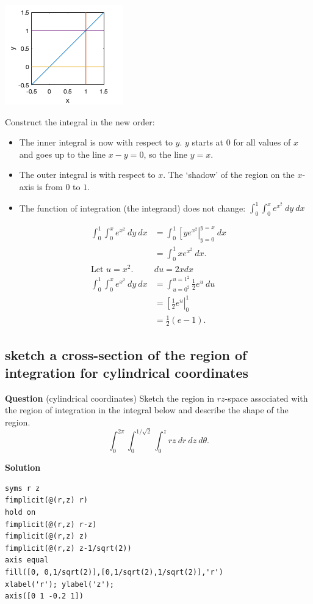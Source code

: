 \documentclass[12pt,letterpaper,noanswers]{exam}
\begin{document}
\includegraphics{img/C12-2dregion.png}

Construct the integral in the new order:
\begin{itemize}
\itemsep0em
    \item The inner integral is now with respect to $y$.  $y$ starts at $0$ for all values of $x$ and goes up to the line $x - y = 0$, so the line $y = x$.  
    \item The outer integral is with respect to $x$.  The `shadow' of the region on the $x$-axis is from $0$ to $1$.
    \item The function of integration (the integrand) does not change: $\displaystyle\int_0^1\int_0^x e^{x^2}\ dy\ dx$
\end{itemize}
\begin{align*}
    \int_0^1\int_0^x e^{x^2}\ dy\ dx &= \int_0^1\left[y e^{x^2}\right\vert_{y=0}^{y=x}\ dx \\
    &= \int_0^1 x e^{x^2}\ dx. \\
    \text{Let }u=x^2. & du = 2xdx\\
    \int_0^1\int_0^x e^{x^2}\ dy\ dx &= \int_{u=0^2}^{u=1^2} \frac{1}{2}e^u \ du \\
    &= \left[ \frac{1}{2}e^u\right\vert_0^1 \\
    &= \frac{1}{2}(e - 1).
\end{align*}


\subsection{sketch a cross-section of the region of integration for cylindrical coordinates}
\noindent\textbf{Question}
(cylindrical coordinates) Sketch the region in $rz$-space associated with the region of integration in the integral below and describe the shape of the region.
\[\int_0^{2\pi}\int_0^{1/\sqrt{2}}\int_0^z rz\ dr\ dz\ d\theta.\]

\noindent\textbf{Solution}


\begin{lstlisting}
syms r z
fimplicit(@(r,z) r)
hold on
fimplicit(@(r,z) r-z)
fimplicit(@(r,z) z)
fimplicit(@(r,z) z-1/sqrt(2))
axis equal
fill([0, 0,1/sqrt(2)],[0,1/sqrt(2),1/sqrt(2)],'r')
xlabel('r'); ylabel('z');
axis([0 1 -0.2 1])
\end{lstlisting}
\end{document}
